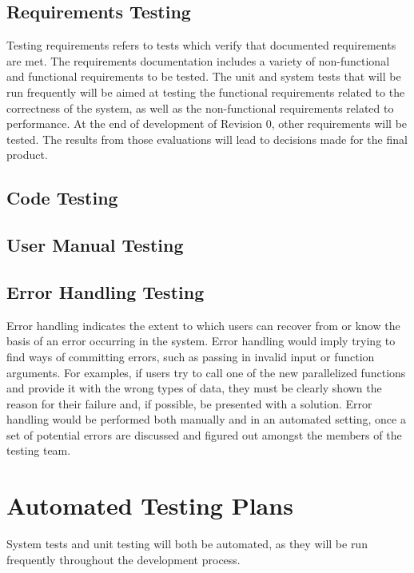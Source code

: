 \documentclass[12pt]{article}
\begin{document}
\subsection{Requirements Testing} %
Testing requirements refers to tests which verify that documented requirements are met. The requirements documentation includes a variety of non-functional and functional requirements to be tested. The unit and system tests that will be run frequently will be aimed at testing the functional requirements related to the correctness of the system, as well as the non-functional requirements related to performance. At the end of development of Revision 0, other requirements will be tested. The results from those evaluations will lead to decisions made for the final product.

\subsection{Code Testing} %

\subsection{User Manual Testing} %

\subsection{Error Handling Testing} %
Error handling indicates the extent to which users can recover from or know the basis of an error occurring in the system. Error handling would imply trying to find ways of committing errors, such as passing in invalid input or function arguments. For examples, if users try to call one of the new parallelized functions and provide it with the wrong types of data, they must be clearly shown the reason for their failure and, if possible, be presented with a solution. Error handling would be performed both manually and in an automated setting, once a set of potential errors are discussed and figured out amongst the members of the testing team.

\section{Automated Testing Plans} %
System tests and unit testing will both be automated, as they will be run frequently throughout the development process.\\
\end{document}
